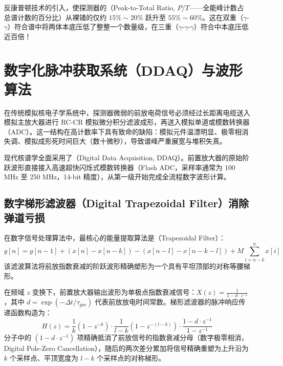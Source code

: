反康普顿技术的引入，使探测器的（Peak-to-Total Ratio, $P/T$——全能峰计数占总谱计数的百分比）从裸锗的仅约 $15\%\sim 20\%$ 跃升至 $55\%\sim 60\%$。这在双重（$\gamma$-$\gamma$）符合谱中将两体本底压低了整整一个数量级，在三重（$\gamma$-$\gamma$-$\gamma$）符合中本底压低近百倍！

\section{数字化脉冲获取系统（DDAQ）与波形算法}
\label{sec:digital_acquisition}

在传统模拟核电子学系统中，探测器微弱的前放电荷信号必须经过长距离电缆送入模拟主放大器进行 RC-CR 模拟微分积分滤波成形，再送入模拟单道或模数转换器（ADC）。这一结构在高计数率下具有致命的缺陷：模拟元件温漂明显、极零相消失调、模拟成形死时间巨大（数十微秒），导致谱峰严重展宽与堆积失真。

现代核谱学全面采用了（Digital Data Acquisition, DDAQ）。前置放大器的原始阶跃波形直接接入高速超快闪烁式模数转换器（Flash ADC，采样率通常为 100 MHz 至 250 MHz，14-bit 精度），从第一级开始完成全流程数字波形计算。

\subsection{数字梯形滤波器（Digital Trapezoidal Filter）消除弹道亏损}

在数字信号处理算法中，最核心的能量提取算法是（Trapezoidal Filter）：
\begin{equation}
    y[n] = y[n-1] + (x[n] - x[n-k]) - (x[n-l] - x[n-k-l]) + M \sum_{i=n-k}^{n} x[i]
    \label{eq:trapezoidal_algo}
\end{equation}
该滤波算法将前放指数衰减的阶跃波形精确塑形为一个具有平坦顶部的对称等腰梯形。

在频域 $z$ 变换下，前置放大器输出波形为单极点指数衰减信号：$X(z) = \frac{1}{1 - d \cdot z^{-1}}$，其中 $d = \exp(-\Delta t/\tau_{\text{pre}})$ 代表前放放电时间常数。梯形滤波器的脉冲响应传递函数构造为：
\begin{equation}
    H(z) = \frac{1}{k} (1 - z^{-k}) \cdot \frac{1}{l-k} (1 - z^{-(l-k)}) \cdot \frac{1 - d \cdot z^{-1}}{1 - z^{-1}}
    \label{eq:trapezoidal_transfer}
\end{equation}
分子中的 $(1 - d \cdot z^{-1})$ 项精确抵消了前放信号的指数衰减分母（数字极零相消，Digital Pole-Zero Cancellation），随后的两次差分累加将信号精确重塑为上升沿为 $k$ 个采样点、平顶宽度为 $l-k$ 个采样点的对称梯形。

